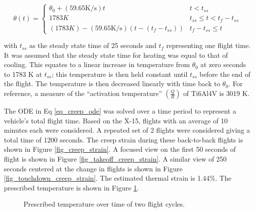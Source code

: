 \documentclass[conf]{new-aiaa}
\begin{document}
\begin{equation}
\theta(t) = \begin{cases}
 \theta_0 + (59.65 \text{K/s})t                & t < t_{ss} \\
1783 K                                         & t_{ss} \leq t < t_f-t_{ss} \\
(1783 K) - (59.65 \text{K/s})(t-(t_f-t_{ss}))  & t_f - t_{ss} \leq t
\end{cases}
\end{equation}

\noindent
with $t_{ss}$ as the steady state time of 25 seconds
and $t_f$ representing one flight time.
It was assumed that the steady state time for heating was
equal to that of cooling.
This equates to a linear increase in temperature from 
$\theta_0$ at zero seconds to 1783 K at $t_{ss}$;
this temperature is then held constant until $t_{ss}$ before
the end of the flight.
The temperature is then decreased linearly with time back to $\theta_0$.
For reference, a measure of the ``activation temperature'' 
$\left(\frac{Q}{R}\right)$ of Ti6Al4V is 3019 K.

The ODE in Eq \ref{eq_creep_ode} was solved over a time period to represent a
vehicle's total flight time.
Based on the X-15, flights with an average of 10 minutes each 
\cite{ kordes_structureal_heating_experiencs_on_the_x15_airplane}
were considered.
A repeated set of 2 flights were considered giving a total time of 1200 seconds.
The creep strain during these back-to-back flights is shown in Figure
\ref{fig_creep_strain}.
A focused view on the first 50 seconds of flight is shown 
in Figure \ref{fig_takeoff_creep_strain}.
A similar view of 250 seconds centered at the change in flights is 
shown in Figure \ref{fig_touchdown_creep_strain}.
The estimated thermal strain is 1.44\%.
The prescribed temperature is shown in Figure \ref{fig_full_temperature}.

\begin{figure}[H]
  \centering
  \caption{ Prescribed temperature over time of two flight cycles.}
  \label{fig_full_temperature}
\end{figure}
\end{document}
